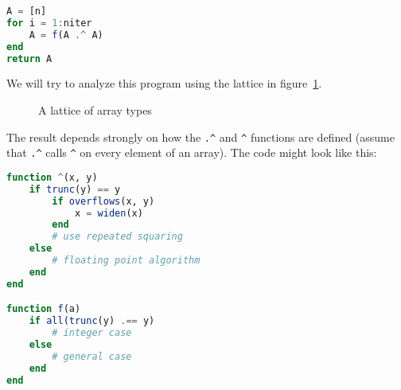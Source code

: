\begin{singlespace}
\begin{lstlisting}[language=julia]
A = [n]
for i = 1:niter
    A = f(A .^ A)
end
return A
\end{lstlisting}
\end{singlespace}

\noindent
We will try to analyze this program using the lattice in figure~\ref{fig:arraylattice}.

\begin{figure}[!t]
\begin{center}
\end{center}
\caption{
  A lattice of array types
}
\label{fig:arraylattice}
\end{figure}

\iffalse
function diag(a)
    if ndims(a) == 1
        n = length(a)
        d = zeros(eltype(a), n, n)
        for i=1:n; d[i,i] = a[i]; end
        d
    elseif ndims(a) == 2
        n = min(size(a,1),size(a,2))
        d = zeros(eltype(a), n)
        for i=1:n; d[i] = a[i,i]; end
        d
    else
        error("expected vector or matrix")
    end
end
\fi

The result depends strongly on how the \texttt{.\^} and \texttt{\^} functions
are defined (assume that \texttt{.\^} calls \texttt{\^} on every element of an array).
The code might look like this:

\begin{singlespace}
\begin{lstlisting}[language=julia]
function ^(x, y)
    if trunc(y) == y
        if overflows(x, y)
            x = widen(x)
        end
        # use repeated squaring
    else
        # floating point algorithm
    end
end

function f(a)
    if all(trunc(y) .== y)
        # integer case
    else
        # general case
    end
end
\end{lstlisting}
\end{singlespace}

